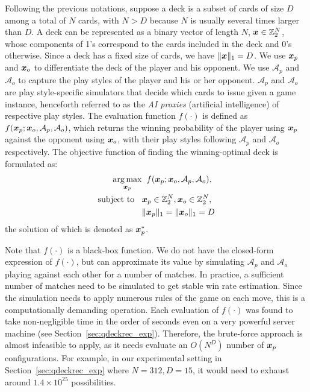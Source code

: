 Following the previous notations, suppose a deck is a subset of cards of size $D$ among a total of $N$ cards, with $N > D$ because $N$ is usually several times larger than $D$. A deck can be represented as a binary vector of length $N$, $ \boldsymbol{x} \in \mathbb{Z}_2^N$, whose components of 1's correspond to the cards included in the deck and 0's otherwise. Since a deck has a fixed size of cards, we have $\|\boldsymbol{x}\|_1=D$. We use $\boldsymbol{x}_p$ and $\boldsymbol{x}_o$ to differentiate the deck of the player and his opponent. We use $\mathcal{A}_p$ and $\mathcal{A}_o$ to capture the play styles of the player and his or her opponent. $\mathcal{A}_p$ and $\mathcal{A}_o$ are play style-specific simulators that decide which cards to issue given a game instance, henceforth referred to as the \textit{AI proxies} (artificial intelligence) of respective play styles. The evaluation function $f(\cdot)$ is defined as $f(\boldsymbol{x}_p; \boldsymbol{x}_o, \mathcal{A}_p, \mathcal{A}_o)$, which returns the winning probability of the player using $\boldsymbol{x}_p$ against the opponent using $\boldsymbol{x}_o$, with their play styles following $\mathcal{A}_p$ and $\mathcal{A}_o$ respectively. The objective function of finding the winning-optimal deck is formulated as:
\begin{align}
\begin{split}
\operatorname*{arg\,max}_{\boldsymbol{x}_p} & \;\; f(\boldsymbol{x}_p; \boldsymbol{x}_o, \mathcal{A}_p, \mathcal{A}_o), \\
\text{subject to } \;\;&\boldsymbol{x}_p \in \mathbb{Z}_2^N, \boldsymbol{x}_o \in \mathbb{Z}_2^N, \\
&\|\boldsymbol{x}_p\|_1=\|\boldsymbol{x}_o\|_1=D
\end{split}
\label{eqn:obj}
\end{align}
the solution of which is denoted as $\boldsymbol{x}_p^*$.

Note that $f(\cdot)$ is a black-box function. We do not have the closed-form expression of $f(\cdot)$, but can approximate its value by simulating $\mathcal{A}_p$ and $\mathcal{A}_o$ playing against each other for a number of matches. In practice, a sufficient number of matches need to be simulated to get stable win rate estimation. Since the simulation needs to apply numerous rules of the game on each move, this is a computationally demanding operation. Each evaluation of $f(\cdot)$ was found to take non-negligible time in the order of seconds even on a very powerful server machine (see Section~\ref{sec:qdeckrec_exp}). Therefore, the brute-force approach is almost infeasible to apply, as it needs evaluate an $O(N^D)$ number of $\boldsymbol{x}_p$ configurations. For example, in our experimental setting in Section~\ref{sec:qdeckrec_exp} where $N=312, D=15$, it would need to exhaust around $1.4 \times 10^{25}$ possibilities. 


